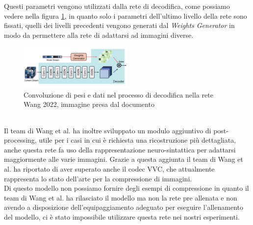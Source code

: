 Questi parametri vengono utilizzati dalla rete di decodifica, come possiamo vedere nella figura \ref{fig:Wang2022Convolution}, in quanto solo i parametri dell’ultimo livello della rete sono fissati, quelli dei livelli precedenti vengono generati dal \textit{Weights Generator} in modo da permettere alla rete di adattarsi ad immagini diverse.\\
\begin{figure}[!h]
    \centering
    \includegraphics[width=0.5\textwidth]{Immagini/Wang2022_Convolution.png}
    \caption{Convoluzione di pesi e dati nel processo di decodifica nella rete Wang 2022, immagine presa dal documento \cite{wang2022neural}}
    \label{fig:Wang2022Convolution}
\end{figure}\\
Il team di Wang et al. ha inoltre sviluppato un modulo aggiuntivo di post-processing, utile per i casi in cui è richiesta una ricostruzione più dettagliata, anche questa rete fa uso della rappresentazione neuro-sintattica per adattarsi maggiormente alle varie immagini. Grazie a questa aggiunta il team di Wang et al. ha riportato di aver superato anche il codec VVC, che attualmente rappresenta lo stato dell’arte per la compressione di immagini.\\
Di questo modello non possiamo fornire degli esempi di compressione in quanto il team di Wang et al. \cite{wang2022neural} ha rilasciato il modello ma non la rete pre allenata e non avendo a disposizione dell'equipaggiamento adeguato per eseguire l'allenamento del modello, ci è stato impossibile utilizzare questa rete nei nostri esperimenti.\\
\newpage


